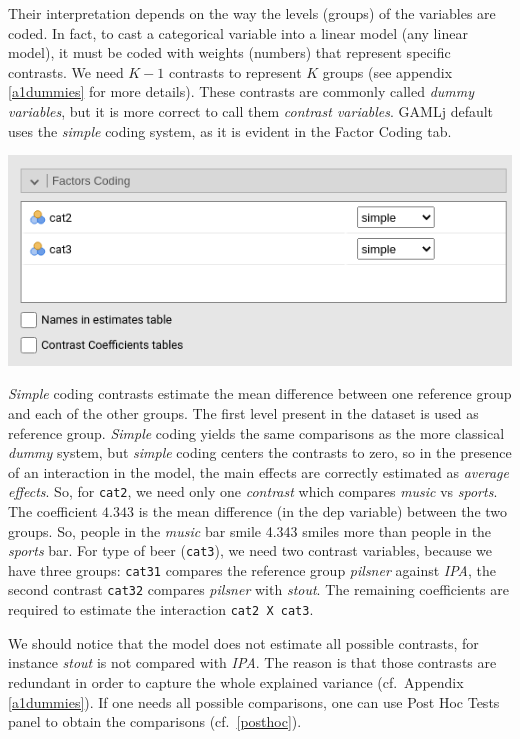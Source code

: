 \documentclass[
]{book}
\begin{document}
Their interpretation depends on the way the levels (groups) of the variables are coded. In fact, to cast a categorical variable into a linear model (any linear model), it must be coded with weights (numbers) that represent specific contrasts. We need \(K-1\) contrasts to represent \(K\) groups (see appendix \ref{a1dummies} for more details). These contrasts are commonly called \emph{dummy variables}, but it is more correct to call them \emph{contrast variables}. {GAMLj} default uses the \emph{simple} coding system, as it is evident in the {Factor Coding} tab.

\includegraphics[width=7.78in]{bookletpics/2_anova_input4}

\emph{Simple} coding contrasts estimate the mean difference between one reference group and each of the other groups. The first level present in the dataset is used as reference group. \emph{Simple} coding yields the same comparisons as the more classical \emph{dummy} system, but \emph{simple} coding centers the contrasts to zero, so in the presence of an interaction in the model, the main effects are correctly estimated as \emph{average effects}. So, for \texttt{cat2}, we need only one \emph{contrast} which compares \emph{music} vs \emph{sports}. The coefficient \(4.343\) is the mean difference (in the dep variable) between the two groups. So, people in the \emph{music} bar smile 4.343 smiles more than people in the \emph{sports} bar. For type of beer (\texttt{cat3}), we need two contrast variables, because we have three groups: \texttt{cat31} compares the reference group \emph{pilsner} against \emph{IPA}, the second contrast \texttt{cat32} compares \emph{pilsner} with \emph{stout}. The remaining coefficients are required to estimate the interaction \texttt{cat2\ X\ cat3}.

We should notice that the model does not estimate all possible contrasts, for instance \emph{stout} is not compared with \emph{IPA}. The reason is that those contrasts are redundant in order to capture the whole explained variance (cf.~Appendix \ref{a1dummies}). If one needs all possible comparisons, one can use {Post Hoc Tests} panel to obtain the comparisons (cf.~\ref{posthoc}).
\end{document}
